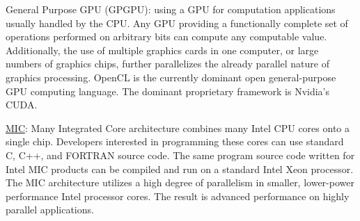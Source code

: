 \documentclass[12pt]{article}
\begin{document}
General Purpose GPU (GPGPU): using a GPU for computation applications usually handled by the CPU. Any GPU providing a functionally complete set of operations performed on arbitrary bits can compute any computable value. Additionally, the use of multiple graphics cards in one computer, or large numbers of graphics chips, further parallelizes the already parallel nature of graphics processing. OpenCL is the currently dominant open general-purpose GPU computing language. The dominant proprietary framework is Nvidia's CUDA.

\underline{MIC}: Many Integrated Core architecture  combines many Intel CPU cores onto a single chip. Developers interested in programming these cores can use standard C, C++, and FORTRAN source code. The same program source code written for Intel MIC products can be compiled and run on a standard Intel Xeon processor. The MIC architecture utilizes a high degree of parallelism in smaller, lower-power performance Intel processor cores. The result is advanced performance on highly parallel applications.
\end{document}
